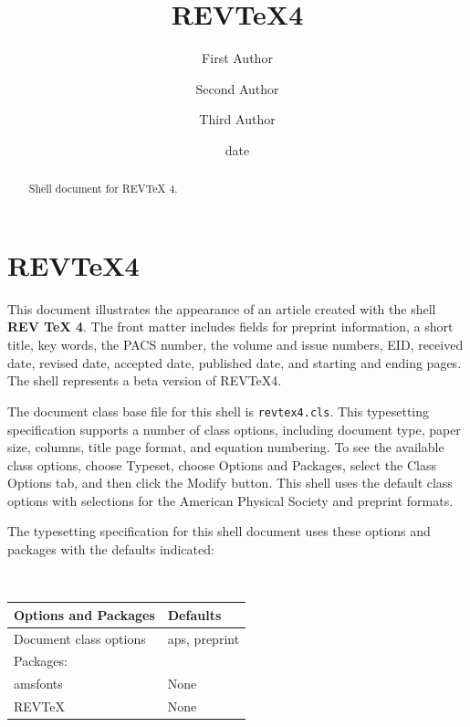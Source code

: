 \documentclass[aps,preprint]{revtex4}%
\begin{document}
\title[Short title for running header]{REV\TeX4}
\author{First Author}
\author{Second Author}
\author{Third Author}

\begin{abstract}
Shell document for REV\TeX{} 4.

\end{abstract}
\date[Date text]{date}




\maketitle
\tableofcontents


\section{REV\TeX4}

This document illustrates the appearance of an article created with the shell
\textbf{REV%
\TeX{}%
4}. The front matter includes fields for preprint information, a short title,
key words, the PACS number, the volume and issue numbers, EID, received date,
revised date, accepted date, published date, and starting and ending pages.
The shell represents a beta version of REV\TeX4.

The document class base file for this shell is \texttt{revtex4.cls}. This
typesetting specification supports a number of class options, including
document type, paper size, columns, title page format, and equation numbering.
To see the available class options, choose \textsf{Typeset, }choose
\textsf{Options and Packages}, select the \textsf{Class Options} tab, and then
click the \textsf{Modify} button. This shell uses the default class options
with selections for the American Physical Society and preprint formats.

The typesetting specification for this shell document uses these options and
packages with the defaults indicated:

\begin{center}
\
\begin{tabular}
[c]{ll}%
\textbf{Options and Packages} & \textbf{Defaults}\\\hline
Document class options & aps, preprint\\
Packages: & \\
\quad amsfonts & None\\
\quad REVTeX & None\\\hline
\end{tabular}

\end{center}
\end{document}
